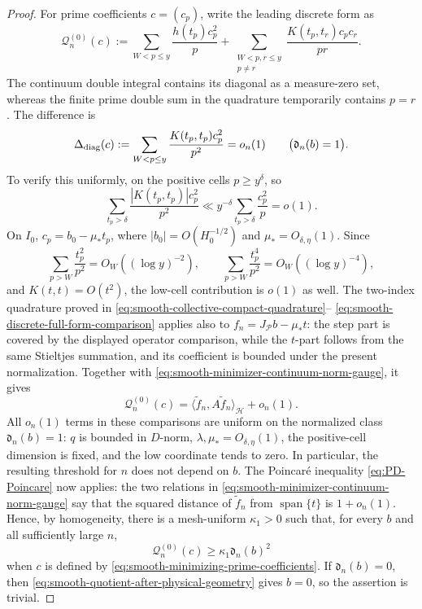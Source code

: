 \documentclass[11pt]{article}
\numberwithin{equation}{section}
\theoremstyle{definition}
\theoremstyle{remark}
\newcommand{\1}{\mathbf 1}
\begin{document}
\begin{proof}
For prime coefficients \(c=(c_p)\), write the leading discrete form as
\begin{equation}
 \mathscr Q_n^{(0)}(c):=
 \sum_{W<p\leq y}\frac{h(t_p)c_p^2}{p}
 +\sum_{\substack{W<p,r\leq y\\p\ne r}}
       \frac{K(t_p,t_r)c_pc_r}{pr}.
 \label{eq:smooth-leading-minimizer-form}
\end{equation}
The continuum double integral contains its diagonal as a measure-zero
set, whereas the finite prime double sum in the quadrature temporarily
contains \(p=r\).  The difference is
\begin{equation}
 \Delta_{\rm diag}(c):=
 \sum_{W<p\leq y}\frac{K(t_p,t_p)c_p^2}{p^2}=o_n(1)
 \qquad\bigl(\mathfrak d_n(b)=1\bigr).
 \label{eq:smooth-minimizer-kernel-diagonal}
\end{equation}
To verify this uniformly, on the positive cells \(p\geq y^\delta\), so
\[
 \sum_{t_p>\delta}\frac{|K(t_p,t_p)|c_p^2}{p^2}
 \ll y^{-\delta}\sum_{t_p>\delta}\frac{c_p^2}{p}=o(1).
\]
On \(I_0\), \(c_p=b_0-\mu_*t_p\), where
\(|b_0|=O(H_0^{-1/2})\) and \(\mu_*=O_{\delta,\eta}(1)\).  Since
\[
 \sum_{p>W}\frac{t_p^2}{p^2}
   =O_W((\log y)^{-2}),\qquad
 \sum_{p>W}\frac{t_p^4}{p^2}
   =O_W((\log y)^{-4}),
\]
and \(K(t,t)=O(t^2)\), the low-cell contribution is \(o(1)\) as well.
The two-index quadrature proved in
\eqref{eq:smooth-collective-compact-quadrature}--
\eqref{eq:smooth-discrete-full-form-comparison} applies also to
\(f_n=J_{\mathcal P}b-\mu_*t\): the step part is covered by the displayed
operator comparison, while the \(t\)-part follows from the same
Stieltjes summation, and its coefficient is bounded under the present
normalization.  Together with
\eqref{eq:smooth-minimizer-continuum-norm-gauge}, it gives
\[
 \mathscr Q_n^{(0)}(c)
 =\langle\widetilde f_n,A\widetilde f_n\rangle_{\mathcal H}+o_n(1).
\]
All \(o_n(1)\) terms in these comparisons are uniform on the normalized
class \(\mathfrak d_n(b)=1\): \(q\) is bounded in \(D\)-norm,
\(\lambda,\mu_*=O_{\delta,\eta}(1)\), the positive-cell dimension is
fixed, and the low coordinate tends to zero.  In particular, the
resulting threshold for \(n\) does not depend on \(b\).
The Poincar\'e inequality \eqref{eq:PD-Poincare} now applies: the two
relations in \eqref{eq:smooth-minimizer-continuum-norm-gauge} say that
the squared distance of \(\widetilde f_n\) from
\(\operatorname{span}\{t\}\) is \(1+o_n(1)\).  Hence, by homogeneity,
there is a mesh-uniform \(\kappa_1>0\) such that, for every \(b\) and all
sufficiently large \(n\),
\begin{equation}
                 \mathscr Q_n^{(0)}(c)
                 \geq\kappa_1\mathfrak d_n(b)^2
 \label{eq:smooth-arithmetic-physical-Poincare-transfer}
\end{equation}
when \(c\) is defined by
\eqref{eq:smooth-minimizing-prime-coefficients}.  If
\(\mathfrak d_n(b)=0\), then
\eqref{eq:smooth-quotient-after-physical-geometry} gives \(b=0\), so
the assertion is trivial.


\end{proof}
\end{document}
